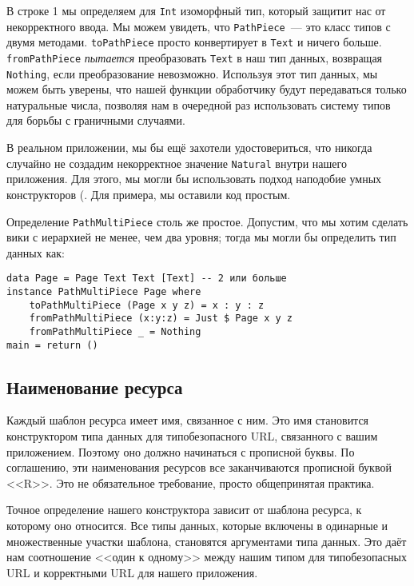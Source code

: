 В строке 1 мы определяем для \lstinline!Int! изоморфный тип, который
защитит нас от некорректного ввода. Мы можем увидеть, что
\lstinline!PathPiece!~--- это класс типов с двумя
методами. \lstinline!toPathPiece! просто конвертирует в
\lstinline!Text! и ничего больше. \lstinline!fromPathPiece!
\emph{пытается} преобразовать \lstinline!Text! в наш тип данных,
возвращая \lstinline!Nothing!, если преобразование
невозможно. Используя этот тип данных, мы можем быть уверены, что
нашей функции обработчику будут передаваться только натуральные числа,
позволяя нам в очередной раз использовать систему типов для борьбы с
граничными случаями.

\begin{remark}
В реальном приложении, мы бы ещё захотели удостовериться, что никогда
случайно не создадим некорректное значение \lstinline!Natural! внутри
нашего приложения. Для этого, мы могли бы использовать подход
наподобие умных конструкторов
(.
Для примера, мы оставили код простым.
\end{remark}

Определение \lstinline!PathMultiPiece! столь же простое. Допустим,
что мы хотим сделать вики с иерархией не менее, чем два уровня;
тогда мы могли бы определить тип данных как:
\begin{lstlisting}
data Page = Page Text Text [Text] -- 2 или больше
instance PathMultiPiece Page where
    toPathMultiPiece (Page x y z) = x : y : z
    fromPathMultiPiece (x:y:z) = Just $ Page x y z
    fromPathMultiPiece _ = Nothing
main = return ()
\end{lstlisting}%

\subsection{Наименование ресурса}
Каждый шаблон ресурса имеет имя, связанное с ним. Это имя становится
конструктором типа данных для типобезопасного URL, связанного с вашим
приложением. Поэтому оно должно начинаться с прописной буквы. По
соглашению, эти наименования ресурсов все заканчиваются прописной
буквой <<R>>. Это не обязательное требование, просто общепринятая
практика.

Точное определение нашего конструктора зависит от шаблона ресурса, к
которому оно относится. Все типы данных, которые включены в одинарные
и множественные участки шаблона, становятся аргументами
типа данных. Это даёт нам соотношение <<один к одному>> между нашим типом для
типобезопасных URL и корректными URL для нашего приложения.

